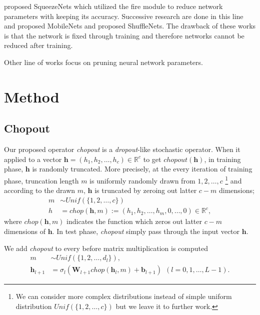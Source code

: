 \documentclass{article}
\begin{document}
    \citet{iandola2016squeezenet} proposed SqueezeNets which utilized the fire module to reduce network parameters with keeping its accuracy. Successive research are done in this line and \citet{howard2017mobilenet} proposed MobileNets and \citet{zhang2017shufflenet} proposed ShuffleNets. The drawback of these works is that the network is fixed through training and therefore networks cannot be reduced after training.

    Other line of works focus on pruning neural network parameters. \citet{han2015learning} 
    
    \section{Method}
    \label{method}

    \subsection{Chopout}
    Our proposed operator \textit{chopout} is a \textit{dropout}-like stochastic operator. 
    When it applied to a vector $\mathbf{h} = (h_1, h_2, \dots, h_c) \in \mathbb{R}^c$ to get $chopout(\mathbf{h})$, in training phase, $\mathbf{h}$ is randomly truncated. 
    More precisely, at the every iteration of training phase, truncation length $m$ is uniformly randomly drawn from ${1, 2, \dots, c}$ \footnote{We can consider more complex distributions instead of simple uniform distribution $Unif(\{1,2, \dots, c\})$ but we leave it to further work.} and according to the drawn $m$, $\mathbf{h}$ is truncated by zeroing out latter $c-m$ dimensions;    
    \begin{align}
        m &\sim Unif(\{1, 2, \dots, c\}) \nonumber \\
        h &= chop(\mathbf{h}, m) := (h_1, h_2, \dots, h_m, 0, \dots, 0) \in \mathbb{R}^c,
    \end{align}    
    where $chop(\mathbf{h}, m)$ indicates the function which zeros out latter $c-m$ dimensions of $\mathbf{h}$.
    In test phase, \textit{chopout} simply pass through the input vector $\mathbf{h}$.

    We add \textit{chopout} to every before matrix multiplication is computed
    \begin{align}
      m &\sim Unif(\{1, 2, \dots, d_l\}), \nonumber \\
      \mathbf{h}_{l+1} &= {\sigma}_l (\mathbf{W}_{l+1} chop(\mathbf{h}_l, m) + \mathbf{b}_{l+1}) \ \ (l=0, 1, \dots, L-1). \label{eq:nn_with_chopout}
    \end{align}
    
\end{document}
